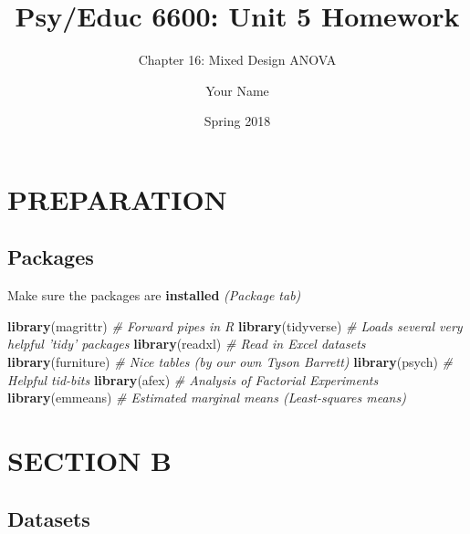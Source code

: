\documentclass[
]{article}
\title{Psy/Educ 6600: Unit 5 Homework}
\subtitle{Chapter 16: Mixed Design ANOVA}
\author{Your Name}
\date{Spring 2018}
\newenvironment{Shaded}{\begin{snugshade}}{\end{snugshade}}
\newcommand{\CommentTok}[1]{\textcolor[rgb]{0.56,0.35,0.01}{\textit{#1}}}
\newcommand{\KeywordTok}[1]{\textcolor[rgb]{0.13,0.29,0.53}{\textbf{#1}}}
\newcommand{\NormalTok}[1]{#1}
\begin{document}
\maketitle

{
\setcounter{tocdepth}{3}
\tableofcontents
}
\clearpage

\listoftables
\listoffigures

\clearpage

\hypertarget{preparation}{%
\section{PREPARATION}\label{preparation}}

\hypertarget{packages}{%
\subsection{Packages}\label{packages}}

Make sure the packages are \textbf{installed} \emph{(Package tab)}

\begin{Shaded}
\begin{Highlighting}[]
\KeywordTok{library}\NormalTok{(magrittr)     }\CommentTok{# Forward pipes in R}
\KeywordTok{library}\NormalTok{(tidyverse)    }\CommentTok{# Loads several very helpful 'tidy' packages}
\KeywordTok{library}\NormalTok{(readxl)       }\CommentTok{# Read in Excel datasets}
\KeywordTok{library}\NormalTok{(furniture)    }\CommentTok{# Nice tables (by our own Tyson Barrett)}
\KeywordTok{library}\NormalTok{(psych)        }\CommentTok{# Helpful tid-bits}
\KeywordTok{library}\NormalTok{(afex)         }\CommentTok{# Analysis of Factorial Experiments}
\KeywordTok{library}\NormalTok{(emmeans)      }\CommentTok{# Estimated marginal means (Least-squares means)}
\end{Highlighting}
\end{Shaded}

\clearpage

\hypertarget{section-b}{%
\section{SECTION B}\label{section-b}}

\hypertarget{datasets}{%
\subsection{Datasets}\label{datasets}}
\end{document}
